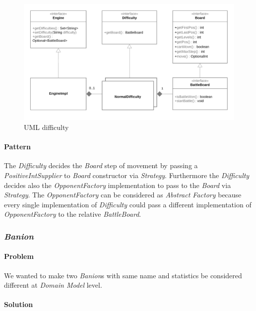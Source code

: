 \documentclass[12pt, a4paper]{report}
\theoremstyle{definition}
\begin{document}
            \begin{figure}[ht]
            \centering{}
            \caption{UML difficulty}
            \includegraphics[width=\textwidth]{difficulty}
            \end{figure}

            \paragraph{Pattern}

            The \emph{Difficulty} decides the \emph{Board} step of movement by passing a \emph{PositiveIntSupplier} to \emph{Board} constructor via \emph{Strategy}.
            Furthermore the \emph{Difficulty} decides also the \emph{OpponentFactory} implementation to pass to the \emph{Board} via \emph{Strategy}.
            The \emph{OpponentFactory} can be considered as \emph{Abstract Factory} because every single implementation of \emph{Difficulty} could pass
            a different implementation of \emph{OpponentFactory} to the relative \emph{BattleBoard}.

        \subsubsection{\emph{Banion}}

            \paragraph{Problem}

            We wanted to make two \emph{Banion}s with same name and statistics be considered different at \emph{Domain Model} level.

            \paragraph{Solution}
\end{document}
